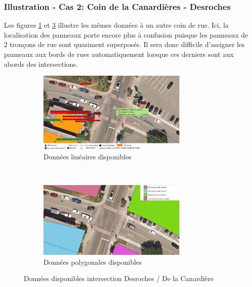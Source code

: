     \subsubsection{Illustration - Cas 2: Coin de la Canardières - Desroches}
    Les figures \ref{fig:donnes_panneaux_Desroches} et \ref{fig:donnes_polygone_panneaux_Desroches} illustre les mêmes données à un autre coin de rue. Ici, la localisation des panneaux porte encore plus à confusion puisque les panneaux de 2 tronçons de rue sont quasiment superposés. Il sera donc difficile d'assigner les panneaux aux bords de rues automatiquement lorsque ces derniers sont aux abords des intersections.
      \begin{figure}[ht]
        \centering
        \begin{subfigure}{\linewidth}
          \centering
          \includegraphics[width=0.8\textwidth]{images/donnees_disponible_Desroches_legende_v2.png}
        \caption{Données linéaires disponibles}
        \label{fig:donnes_panneaux_Desroches}
        \end{subfigure} \\
        \begin{subfigure}{\linewidth}
          \centering
          \includegraphics[width=0.8\textwidth]{images/utilisation_sols_Desroches_v2.png}
        \caption{Données polygonales disponibles}
        \label{fig:donnes_polygone_panneaux_Desroches}
        \end{subfigure}
        \caption{Données disponibles intersection Desroches / De la Canardière}
      \end{figure}
